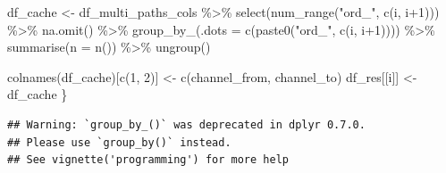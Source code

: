 \documentclass[
]{book}
\newenvironment{Shaded}{\begin{snugshade}}{\end{snugshade}}
\newcommand{\AttributeTok}[1]{\textcolor[rgb]{0.77,0.63,0.00}{#1}}
\newcommand{\DecValTok}[1]{\textcolor[rgb]{0.00,0.00,0.81}{#1}}
\newcommand{\FunctionTok}[1]{\textcolor[rgb]{0.00,0.00,0.00}{#1}}
\newcommand{\NormalTok}[1]{#1}
\newcommand{\OtherTok}[1]{\textcolor[rgb]{0.56,0.35,0.01}{#1}}
\newcommand{\SpecialCharTok}[1]{\textcolor[rgb]{0.00,0.00,0.00}{#1}}
\newcommand{\StringTok}[1]{\textcolor[rgb]{0.31,0.60,0.02}{#1}}
\begin{document}
\begin{Shaded}
\begin{Highlighting}[]
\NormalTok{        df\_cache }\OtherTok{\textless{}{-}}\NormalTok{ df\_multi\_paths\_cols }\SpecialCharTok{\%\textgreater{}\%}
                \FunctionTok{select}\NormalTok{(}\FunctionTok{num\_range}\NormalTok{(}\StringTok{"ord\_"}\NormalTok{, }\FunctionTok{c}\NormalTok{(i, i}\SpecialCharTok{+}\DecValTok{1}\NormalTok{))) }\SpecialCharTok{\%\textgreater{}\%}
                \FunctionTok{na.omit}\NormalTok{() }\SpecialCharTok{\%\textgreater{}\%}
                \FunctionTok{group\_by\_}\NormalTok{(}\AttributeTok{.dots =} \FunctionTok{c}\NormalTok{(}\FunctionTok{paste0}\NormalTok{(}\StringTok{"ord\_"}\NormalTok{, }\FunctionTok{c}\NormalTok{(i, i}\SpecialCharTok{+}\DecValTok{1}\NormalTok{)))) }\SpecialCharTok{\%\textgreater{}\%}
                \FunctionTok{summarise}\NormalTok{(}\AttributeTok{n =} \FunctionTok{n}\NormalTok{()) }\SpecialCharTok{\%\textgreater{}\%}
                \FunctionTok{ungroup}\NormalTok{()}
         
        \FunctionTok{colnames}\NormalTok{(df\_cache)[}\FunctionTok{c}\NormalTok{(}\DecValTok{1}\NormalTok{, }\DecValTok{2}\NormalTok{)] }\OtherTok{\textless{}{-}} \FunctionTok{c}\NormalTok{(}\StringTok{\textquotesingle{}channel\_from\textquotesingle{}}\NormalTok{, }\StringTok{\textquotesingle{}channel\_to\textquotesingle{}}\NormalTok{)}
\NormalTok{        df\_res[[i]] }\OtherTok{\textless{}{-}}\NormalTok{ df\_cache}
\NormalTok{\}}
\end{Highlighting}
\end{Shaded}

\begin{verbatim}
## Warning: `group_by_()` was deprecated in dplyr 0.7.0.
## Please use `group_by()` instead.
## See vignette('programming') for more help
\end{verbatim}
\end{document}
